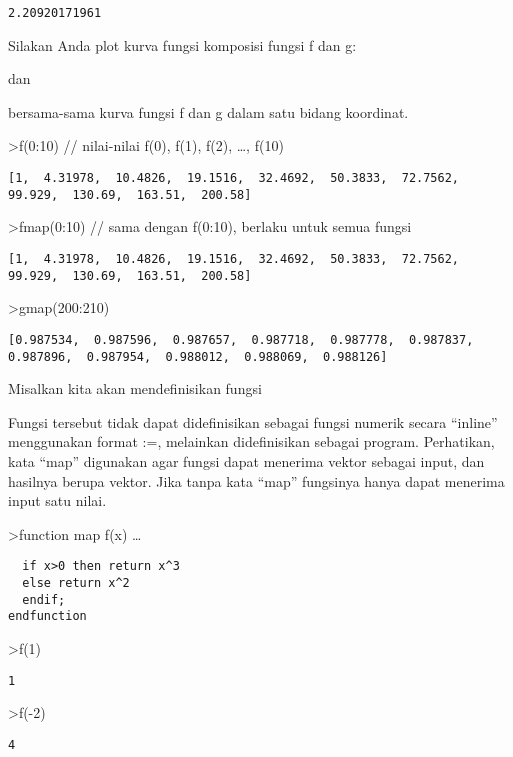 \documentclass[
]{book}
\begin{document}
\begin{verbatim}
2.20920171961
\end{verbatim}

Silakan Anda plot kurva fungsi komposisi fungsi f dan g:

dan

bersama-sama kurva fungsi f dan g dalam satu bidang koordinat.

\textgreater f(0:10) // nilai-nilai f(0), f(1), f(2), \ldots, f(10)

\begin{verbatim}
[1,  4.31978,  10.4826,  19.1516,  32.4692,  50.3833,  72.7562,
99.929,  130.69,  163.51,  200.58]
\end{verbatim}

\textgreater fmap(0:10) // sama dengan f(0:10), berlaku untuk semua fungsi

\begin{verbatim}
[1,  4.31978,  10.4826,  19.1516,  32.4692,  50.3833,  72.7562,
99.929,  130.69,  163.51,  200.58]
\end{verbatim}

\textgreater gmap(200:210)

\begin{verbatim}
[0.987534,  0.987596,  0.987657,  0.987718,  0.987778,  0.987837,
0.987896,  0.987954,  0.988012,  0.988069,  0.988126]
\end{verbatim}

Misalkan kita akan mendefinisikan fungsi

Fungsi tersebut tidak dapat didefinisikan sebagai fungsi numerik secara ``inline'' menggunakan format :=, melainkan didefinisikan sebagai program. Perhatikan, kata ``map'' digunakan agar fungsi dapat menerima vektor sebagai input, dan hasilnya berupa vektor. Jika tanpa kata ``map'' fungsinya hanya dapat menerima input satu nilai.

\textgreater function map f(x) \ldots{}

\begin{verbatim}
  if x>0 then return x^3
  else return x^2
  endif;
endfunction
\end{verbatim}

\textgreater f(1)

\begin{verbatim}
1
\end{verbatim}

\textgreater f(-2)

\begin{verbatim}
4
\end{verbatim}
\end{document}
